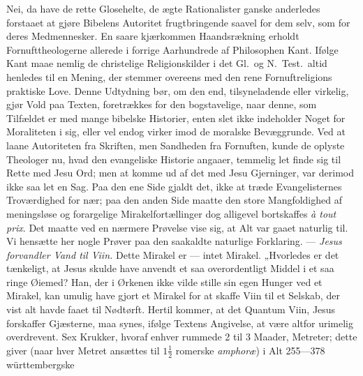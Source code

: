 \documentclass[12pt,a4paper]{book}
\begin{document}
Nei, da have de rette Glosehelte, de ægte Rationalister ganske anderledes forstaaet at gjøre
Bibelens Autoritet frugtbringende saavel for dem selv, som for deres Medmennesker. En saare
kjærkommen Haandsrækning erholdt Fornufttheologerne allerede i forrige Aarhundrede af
Philosophen Kant. Ifølge Kant maae nemlig de christelige Religionskilder i det Gl.\ og
N.\ Test.\ altid henledes til en Mening, der stemmer overeens med den rene Fornuftreligions
praktiske Love. Denne Udtydning bør, om den end, tilsyneladende eller virkelig, gjør Vold
paa Texten, foretrækkes for den bogstavelige, naar denne, som Tilfældet er med mange bibelske
Historier, enten slet ikke indeholder Noget for Moraliteten i sig, eller vel endog virker
imod de moralske Bevæggrunde. Ved at laane Autoriteten fra Skriften, men Sandheden fra
Fornuften, kunde de oplyste Theologer nu, hvad den evangeliske Historie angaaer, temmelig let
finde sig til Rette med Jesu Ord; men at komme ud af det med Jesu Gjerninger, var derimod
ikke saa let en Sag. Paa den ene Side gjaldt det, ikke at træde Evangelisternes Troværdighed
for nær; paa den anden Side maatte den store Mangfoldighed af meningsløse og forargelige
Mirakelfortællinger dog alligevel bortskaffes \textit{à tout prix}. Det maatte ved en
nærmere Prøvelse vise sig, at Alt var gaaet naturlig til. Vi hensætte her nogle Prøver paa
den saakaldte naturlige Forklaring. --- \emph{Jesus forvandler Vand til Viin.} Dette Mirakel
er --- intet Mirakel. „Hvorledes er det tænkeligt, at Jesus skulde have anvendt et saa
overordentligt Middel i et saa ringe Øiemed? Han, der i Ørkenen ikke vilde stille sin egen
Hunger ved et Mirakel, kan umulig have gjort et Mirakel for at skaffe Viin til et Selskab,
der vist alt havde faaet til Nødtørft. Hertil kommer, at det Quantum Viin, Jesus forskaffer
Gjæsterne, maa synes, ifølge Textens Angivelse, at være altfor urimelig overdrevent. Sex
Krukker, hvoraf enhver rummede 2 til 3 Maader, Metreter; dette giver (naar hver Metret
ansættes til $1\frac{1}{2}$ romerske \textit{amphoræ}) i Alt 255---378 württembergske
\end{document}
